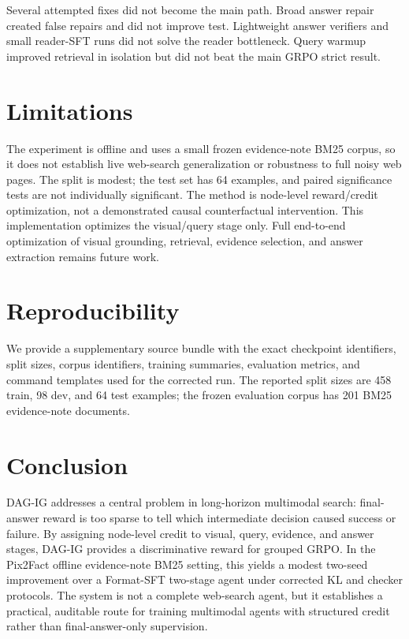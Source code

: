 Several attempted fixes did not become the main path. Broad answer repair created false repairs and did not improve test. Lightweight answer verifiers and small reader-SFT runs did not solve the reader bottleneck. Query warmup improved retrieval in isolation but did not beat the main GRPO strict result.

\section{Limitations}

The experiment is offline and uses a small frozen evidence-note BM25 corpus, so it does not establish live web-search generalization or robustness to full noisy web pages. The split is modest; the test set has 64 examples, and paired significance tests are not individually significant. The method is node-level reward/credit optimization, not a demonstrated causal counterfactual intervention. This implementation optimizes the visual/query stage only. Full end-to-end optimization of visual grounding, retrieval, evidence selection, and answer extraction remains future work.

\section{Reproducibility}

We provide a supplementary source bundle with the exact checkpoint identifiers, split sizes, corpus identifiers, training summaries, evaluation metrics, and command templates used for the corrected run. The reported split sizes are 458 train, 98 dev, and 64 test examples; the frozen evaluation corpus has 201 BM25 evidence-note documents.

\section{Conclusion}

DAG-IG addresses a central problem in long-horizon multimodal search: final-answer reward is too sparse to tell which intermediate decision caused success or failure. By assigning node-level credit to visual, query, evidence, and answer stages, DAG-IG provides a discriminative reward for grouped GRPO. In the Pix2Fact offline evidence-note BM25 setting, this yields a modest two-seed improvement over a Format-SFT two-stage agent under corrected KL and checker protocols. The system is not a complete web-search agent, but it establishes a practical, auditable route for training multimodal agents with structured credit rather than final-answer-only supervision.
